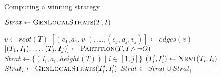 %
\begin{algorithm}[t]
   \caption{Computing a winning strategy}\label{alg:strat}
   \begin{algorithmic}[1]
            \State $Strat \gets \Call{GenLocalStrats}{T,I}$
            \State {}
        \EndFunction
        \Statex

            \State $v \gets root(T)$
            \State $[(e_1, a_1, v_1),\ldots,(e_j,a_j,v_j)] \gets edges(v)$
            \State $[(T_1,I_1),\ldots,(T_j, I_j)] \gets \textsc{Partition}(T, I \land \neg O)$
            \State $Strat \gets \{(I_i, a_i, height(T)) \mid i \in[1,j]\}$\label{alg:strat:strati}
            \label{alg:strat:for}
                \State $(T_i', I_i') \gets \textsc{Next}(T_i, I_i)$\label{alg:strat:next}
                \State $Strat_i \gets \Call{GenLocalStrats}{T_i', I_i'}$\label{alg:strat:rec}
                \State $Strat \gets Strat \cup Strat_i$
            \EndFor\label{alg:strat:endfor}
            \State {} \label{alg:strat:return}
        \EndFunction
    \end{algorithmic}
\end{algorithm}
%
